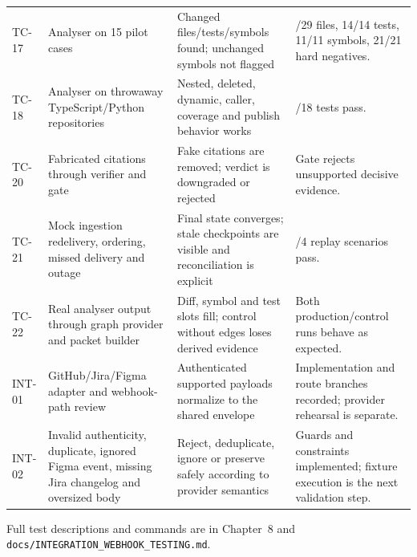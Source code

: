 \begin{longtable}{>{\raggedright\arraybackslash}p{}>{\raggedright\arraybackslash}p{}>{\raggedright\arraybackslash}p{}>{\raggedright\arraybackslash}p{}}
TC-17 & Analyser on 15 pilot cases & Changed files/tests/symbols found; unchanged symbols not flagged & 29/29 files, 14/14 tests, 11/11 symbols, 21/21 hard negatives.\\
TC-18 & Analyser on throwaway TypeScript/Python repositories & Nested, deleted, dynamic, caller, coverage and publish behavior works & 18/18 tests pass.\\
TC-20 & Fabricated citations through verifier and gate & Fake citations are removed; verdict is downgraded or rejected & Gate rejects unsupported decisive evidence.\\
TC-21 & Mock ingestion redelivery, ordering, missed delivery and outage & Final state converges; stale checkpoints are visible and reconciliation is explicit & 4/4 replay scenarios pass.\\
TC-22 & Real analyser output through graph provider and packet builder & Diff, symbol and test slots fill; control without edges loses derived evidence & Both production/control runs behave as expected.\\
INT-01 & GitHub/Jira/Figma adapter and webhook-path review & Authenticated supported payloads normalize to the shared envelope & Implementation and route branches recorded; provider rehearsal is separate.\\
INT-02 & Invalid authenticity, duplicate, ignored Figma event, missing Jira changelog and oversized body & Reject, deduplicate, ignore or preserve safely according to provider semantics & Guards and constraints implemented; fixture execution is the next validation step.\\
\bottomrule
\end{longtable}

\noindent Full test descriptions and commands are in Chapter~8 and
\texttt{docs/INTEGRATION\_WEBHOOK\_TESTING.md}.
